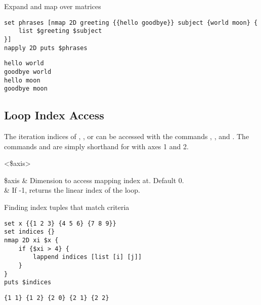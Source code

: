 \begin{example}{Expand and map over matrices}
\begin{lstlisting}
set phrases [nmap 2D greeting {{hello goodbye}} subject {world moon} {
    list $greeting $subject
}]
napply 2D puts $phrases
\end{lstlisting}
\tcblower
\begin{lstlisting}
hello world
goodbye world
hello moon
goodbye moon
\end{lstlisting}
\end{example}
\clearpage
\subsection{Loop Index Access}
The iteration indices of , , or  can be accessed with the commands , , and . 
The commands  and  are simply shorthand for  with axes 1 and 2.
\begin{syntax}
 <\$axis>
\end{syntax}
\begin{syntax}
\end{syntax}
\begin{syntax}
\end{syntax}
\begin{args}	
\$axis & Dimension to access mapping index at. Default 0. \\
 & If -1, returns the linear index of the loop.
\end{args}

\begin{example}{Finding index tuples that match criteria}
\begin{lstlisting}
set x {{1 2 3} {4 5 6} {7 8 9}}
set indices {}
nmap 2D xi $x {
    if {$xi > 4} {
        lappend indices [list [i] [j]]
    }
}
puts $indices
\end{lstlisting}
\tcblower
\begin{lstlisting}
{1 1} {1 2} {2 0} {2 1} {2 2}
\end{lstlisting}
\end{example}




\clearpage
